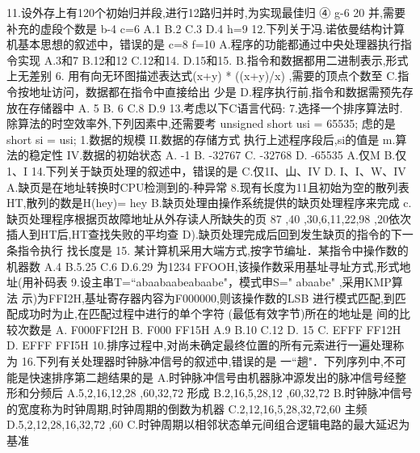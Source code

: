 11.设外存上有120个初始归并段,进行12路归并时,为实现最佳归
④
g-6
20
并,需要补充的虚段个数是
b-4
c=6
A.1
B.2
C.3
D.4
h=9
12.下列关于冯.诺依曼结构计算机基本思想的叙述中，错误的是
c=8
f=10
A.程序的功能都通过中央处理器执行指令实现
A.3和7
B.12和12
C.12和14.
D.15和15.
B.指令和数据都用二进制表示,形式上无差别
6. 用有向无环图描述表达式(x+y) * ((x+y)/x) ,需要的顶点个数至
C.指令按地址访问，数据都在指令中直接给出
少是
D.程序执行前,指令和数据需预先存放在存储器中
A. 5
B. 6
C.8
D.9
13.考虑以下C语言代码:
7.选择一个排序算法时.除算法的时空效率外,下列因素中,还需要考
unsigned short usi = 65535;
虑的是
short si = usi;
1.数据的规模
II.数据的存储方式
执行上述程序段后,si的值是
m.算法的稳定性
IV.数据的初始状态
A. -1
B. -32767
C. -32768
D. -65535
A.仅M
B.仅1、I
14.下列关于缺页处理的叙述中，错误的是
C.仅1I、山、IV
D. I、I、W、IV
A.缺页是在地址转换时CPU检测到的-种异常
8.现有长度为11且初始为空的散列表HT,散列的数是H(hey)= hey
B.缺页处理由操作系统提供的缺页处理程序来完成
c.缺页处理程序根据页故障地址从外存读人所缺失的页
87 ,40 ,30,6,11,22,98 ,20依次插人到HT后,HT查找失败的平均查
D).缺页处理完成后回到发生缺页的指令的下一条指令执行
找长度是
15. 某计算机采用大端方式,按字节编址．某指令中操作数的机器数
A.4
B.5.25
C.6
D.6.29
为1234 FFOOH,该操作数采用基址寻址方式,形式地址(用补码表
9.设主串T=“abaabaabeabaabe"，模式申S=" abaabe" ,采用KMP算法
示)为FFI2H,基址寄存器内容为F000000,则该操作数的LSB
进行模式匹配,到匹配成功时为止,在匹配过程中进行的单个字符
(最低有效字节)所在的地址是
间的比较次数是
A. F000FFI2H
B. F000 FF15H
A.9
B.10
C.12
D. 15
C. EFFF FF12H
D. EFFF FFI5H
10.排序过程中,对尚未确定最终位置的所有元索进行一遍处理称为
16.下列有关处理器时钟脉冲信号的叙述中,错误的是
一“趟"．下列序列中,不可能是快速排序第二趟结果的是
A.时钟脉冲信号由机器脉冲源发出的脉冲信号经整形和分频后
A.5,2,16,12,28 ,60,32,72
形成
B.2,16,5,28,12 ,60,32,72
B.时钟脉冲信号的宽度称为时钟周期,时钟周期的倒数为机器
C.2,12,16,5,28,32,72,60
主频
D.5,2,12,28,16,32,72 ,60
C.时钟周期以相邻状态单元间组合逻辑电路的最大延迟为基准

